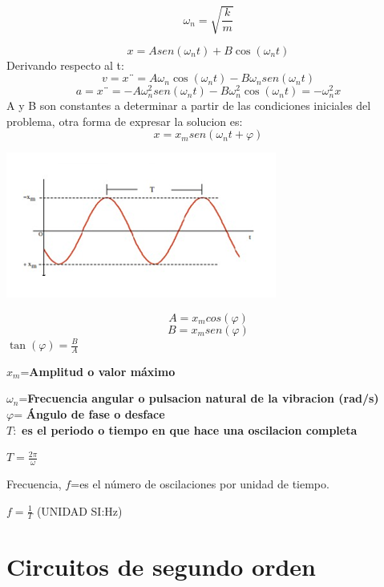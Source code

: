 \documentclass[oneside,12pt]{report}
\begin{document}
 \begin{equation}
 	\omega_{n}=\sqrt{\frac{k}{m}}
 \end{equation}

\begin{equation}
x=A sen(\omega_n t)+B\cos(\omega_n t)
\end{equation}
 	Derivando respecto al t:
 \begin{equation}
 	v=x¨=A\omega_n \cos(\omega_n t)-B\omega_n sen(\omega_n t)
 \end{equation}
\begin{equation}
	a=x¨=-A\omega_n^{2} sen(\omega_n t)-B\omega_n^{2} \cos(\omega_n t)=-\omega_n^{2}x
\end{equation}
A y B son constantes a determinar a partir de las condiciones iniciales del problema, otra forma de expresar la solucion es:
\begin{equation}
	x=x_msen(\omega_n t+\varphi)
\end{equation}
\begin{center}
	\includegraphics[width=0.7\linewidth]{imagen4}
\end{center}
$$A=x_m cos(\varphi)$$
$$B=x_m sen(\varphi)$$
$\tan(\varphi)=\frac{B}{A}$

$x_m$=\textbf{Amplitud o valor máximo}

$\omega_n$=\textbf{Frecuencia angular o pulsacion natural de la vibracion (rad/s)}\\
$\varphi$= \textbf{Ángulo de fase o desface}\\

$T:$ \textbf{es el periodo o tiempo en que hace una oscilacion completa}

$T=\frac{2\pi}{\omega}$

Frecuencia, $f$=es el número de oscilaciones por unidad de tiempo.

$f=\frac{1}{T}$  (UNIDAD SI:Hz)
\section{Circuitos de segundo orden}
\end{document}
